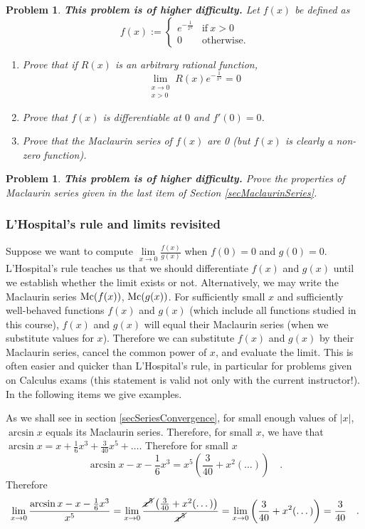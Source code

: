 \documentclass[12pt]{book}
\newtheorem{problem}[theorem]{Problem}
\newcommand{\doublebrace}[4]{\left\{\begin{array}{ll} #1 & #2 \\#3 & #4  \end{array} \right.}
\begin{document}
\begin{problem}\label{probDifferentiableNonAnalyticFunctionExample}
 \textbf{This problem is of higher difficulty.}
Let $f(x)$ be defined as
\[
f(x):=\doublebrace{e^{-\frac{1}{x^2}}}{\mathrm{if~} x>0}{0}{\mathrm{otherwise.}}
\]
\begin{enumerate}
\item Prove that if $R(x)$ is an arbitrary rational function,
\[
\lim\limits_{\substack{x\to 0\\ x>0}} R(x)e^{-\frac{1}{x^2}}=0
\]
\item Prove that $f(x)$ is differentiable at $0$ and $f'(0)=0$.
\item Prove that the Maclaurin series of $f(x)$ are 0 (but $f(x)$ is clearly a non-zero function).
\end{enumerate}

\end{problem}
\begin{problem}\textbf{This problem is of higher difficulty.} Prove the properties of Maclaurin series given in the last item of Section \ref{secMaclaurinSeries}.
\end{problem}

\subsubsection{L'Hospital's rule and limits revisited}\label{secLHospitalRevisited}
Suppose we want to compute $\lim\limits_{x\to 0} \frac{f(x)}{g(x)}$ when $f(0)= 0$ and $g(0)=0$.
L'Hospital's rule teaches us that we should differentiate $f(x)$ and $g(x)$ until we establish whether the limit exists or not. Alternatively, we may write the Maclaurin series $\operatorname{{\normalfont{Mc}}} (f(x))$, $\operatorname{{\normalfont{Mc}}} (g(x))$. For sufficiently small $x$ and sufficiently well-behaved functions $f(x)$ and $g(x)$ (which include all functions studied in this course), $f(x)$ and $g(x)$ will equal their Maclaurin series (when we substitute values for $x$). Therefore we can substitute $f(x)$ and $g(x)$ by their Maclaurin series, cancel the common power of $x$, and evaluate the limit. This is often easier and quicker than L'Hospital's rule, in particular for problems given on Calculus exams (this statement is valid not only with the current instructor!). In the following items we give examples.

As we shall see in section \ref{secSeriesConvergence}, for small enough values of $|x|$, $\arcsin x$ equals its Maclaurin series. Therefore, for small $x$, we have that $\arcsin x = x+\frac{1}6x^3 + \frac{3}{40}x^5+\dots $. Therefore for small $x$
\[
\arcsin x- x- \frac{1}6x^3= x^5 \left(\frac{3}{40}+x^2(\dots)\right)\quad .
\] Therefore
\[
\lim\limits_{x\to 0} \frac{\arcsin x- x- \frac{1}6x^3}{x^5}= \lim\limits_{x\to 0} \frac{ \cancel{x^5} \left(\frac{3}{40}+x^2(\dots)\right)}{\cancel{x^5}} =  \lim\limits_{x\to 0}  \left(\frac{3}{40}+x^2(\dots)\right) =\frac{3}{40}\quad .
\]
\end{document}

